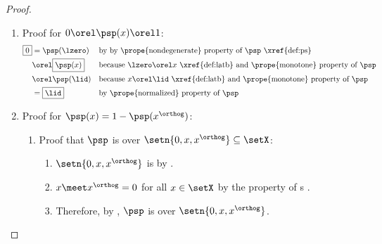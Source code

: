 \begin{proof}
  \begin{enumerate}
    \item Proof for $0\orel\psp(x)\orel 1$:
      \begin{align*}
        \boxed{0}
          &= \psp(\lzero)
          && \text{by by \prope{nondegenerate} property of $\psp$ \xref{def:ps}}
        \\&\orel \boxed{\psp(x)}
          && \text{because $\lzero\orel x$ \xref{def:latb} and \prope{monotone} property of $\psp$}
        \\&\orel \psp(\lid)
          && \text{because $x\orel\lid$ \xref{def:latb} and \prope{monotone} property of $\psp$}
        \\&= \boxed{\lid}
          && \text{by \prope{normalized} property of $\psp$}
      \end{align*}
    \item Proof for $\psp(x)=1-\psp({x^\orthog})$:
      \begin{enumerate}
        \item Proof that $\psp$ is   over $\setn{0,x,x^\orthog}\subseteq\setX$: \label{item:ps_additive}
          \begin{enumerate}
            \item $\setn{0,x,x^\orthog}$ is  by .
            \item $x\meet x^\orthog=0$ for all $x\in\setX$ by the  property of 
                  s .
            \item Therefore, by , $\psp$ is  over $\setn{0,x,x^\orthog}$.
          \end{enumerate}
      

\end{enumerate}
\end{enumerate}
\end{proof}
